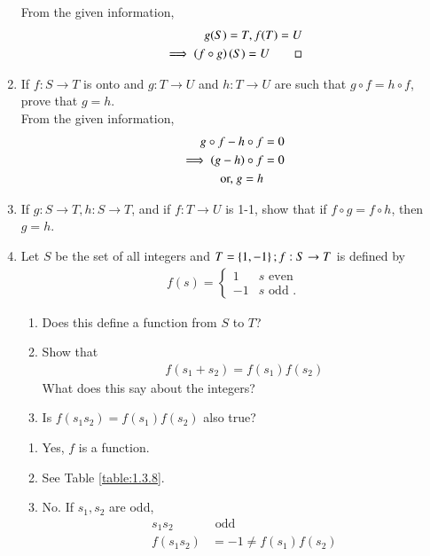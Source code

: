 \begin{enumerate}[label=\arabic*.,ref=\thesubsection.\theenumi]
\solution  From the given information, 
\begin{align}
	g(S) = T, f(T) = U
	\\
	\implies \left(f\circ g\right) (S) = U \qed
\end{align}
\item  If $f: S   \rightarrow T$ is onto and $g : T \rightarrow U$ and $h : T  \rightarrow U$ are such that $g\circ f = h \circ f$,  prove that $g = h$.
	\\
	\solution From the given information, 
	\begin{align}
		g\circ f - h \circ f &= 0 
		\\
		\implies \left(g-h\right)\circ f &=0
		\\
		\text{or, } g = h
	\end{align}
\item If $g: S  \rightarrow T, h : S  \rightarrow T$, and if $f: T  \rightarrow U$ is 1-1, show that if $f  \circ  g = f   \circ  h$, then $g = h$.
\item Let $S$ be the set of all integers and $T = \left\{1, -1\right\}; f: S  \rightarrow T$ is defined by 
	\begin{align}
		f(s)=
	\begin{cases}
 1 & s \text{ even}
		\\
		-1 & s \text{ odd } .
	\end{cases}
	\end{align}
\begin{enumerate}
\item Does this define a function from $S$ to $T$? 
\item  Show that 
	\begin{align}
	f(s_1 + s_2) = f(s_1)f(s_2)
	\end{align}
What does this say about the integers?
\item  Is $f(s_1s_2) = f(s_1)f(s_2)$ also true?
\end{enumerate}
\solution
\begin{enumerate}
	\item Yes, $f$ is a function.
	\item  See Table 
			\ref{table:1.3.8}.
		\begin{table}[!h]
			\centering
			
			\caption{}
			\label{table:1.3.8}
		\end{table}
	\item No. If $s_1,s_2$ are odd, 
	\begin{align}
		s_1s_2 & \text{ odd}
		\\
		f(s_1s_2) &= -1 \ne f(s_1)f(s_2)

\end{align}
\end{enumerate}
\end{enumerate}
